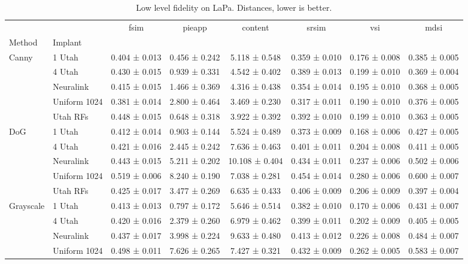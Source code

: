 \begin{table}
\caption{Low level fidelity on LaPa. Distances, lower is better.}
\label{tab:low_lapa}
\begin{tabular}{llcccccc}
\toprule
 &  & fsim & pieapp & content & srsim & vsi & mdsi \\
Method & Implant &  &  &  &  &  &  \\
\midrule
\multirow[t]{5}{*}{Canny} & 1 Utah & 0.404 ± 0.013 & 0.456 ± 0.242 & 5.118 ± 0.548 & 0.359 ± 0.010 & 0.176 ± 0.008 & 0.385 ± 0.005 \\
 & 4 Utah & 0.430 ± 0.015 & 0.939 ± 0.331 & 4.542 ± 0.402 & 0.389 ± 0.013 & 0.199 ± 0.010 & 0.369 ± 0.004 \\
 & Neuralink & 0.415 ± 0.015 & 1.466 ± 0.369 & 4.316 ± 0.438 & 0.354 ± 0.014 & 0.195 ± 0.010 & 0.368 ± 0.005 \\
 & Uniform 1024 & 0.381 ± 0.014 & 2.800 ± 0.464 & 3.469 ± 0.230 & 0.317 ± 0.011 & 0.190 ± 0.010 & 0.376 ± 0.005 \\
 & Utah RFs & 0.448 ± 0.015 & 0.648 ± 0.318 & 3.922 ± 0.392 & 0.392 ± 0.010 & 0.199 ± 0.010 & 0.363 ± 0.005 \\
\cline{1-8}
\multirow[t]{5}{*}{DoG} & 1 Utah & 0.412 ± 0.014 & 0.903 ± 0.144 & 5.524 ± 0.489 & 0.373 ± 0.009 & 0.168 ± 0.006 & 0.427 ± 0.005 \\
 & 4 Utah & 0.421 ± 0.016 & 2.445 ± 0.242 & 7.636 ± 0.463 & 0.401 ± 0.011 & 0.204 ± 0.008 & 0.411 ± 0.005 \\
 & Neuralink & 0.443 ± 0.015 & 5.211 ± 0.202 & 10.108 ± 0.404 & 0.434 ± 0.011 & 0.237 ± 0.006 & 0.502 ± 0.006 \\
 & Uniform 1024 & 0.519 ± 0.006 & 8.240 ± 0.190 & 7.038 ± 0.281 & 0.454 ± 0.014 & 0.280 ± 0.006 & 0.600 ± 0.007 \\
 & Utah RFs & 0.425 ± 0.017 & 3.477 ± 0.269 & 6.635 ± 0.433 & 0.406 ± 0.009 & 0.206 ± 0.009 & 0.397 ± 0.004 \\
\cline{1-8}
\multirow[t]{5}{*}{Grayscale} & 1 Utah & 0.413 ± 0.013 & 0.797 ± 0.172 & 5.646 ± 0.514 & 0.382 ± 0.010 & 0.170 ± 0.006 & 0.431 ± 0.007 \\
 & 4 Utah & 0.420 ± 0.016 & 2.379 ± 0.260 & 6.979 ± 0.462 & 0.399 ± 0.011 & 0.202 ± 0.009 & 0.405 ± 0.005 \\
 & Neuralink & 0.437 ± 0.017 & 3.998 ± 0.224 & 9.633 ± 0.480 & 0.413 ± 0.012 & 0.226 ± 0.008 & 0.484 ± 0.007 \\
 & Uniform 1024 & 0.498 ± 0.011 & 7.626 ± 0.265 & 7.427 ± 0.321 & 0.432 ± 0.009 & 0.262 ± 0.005 & 0.583 ± 0.007 \\

\end{tabular}
\end{table}
